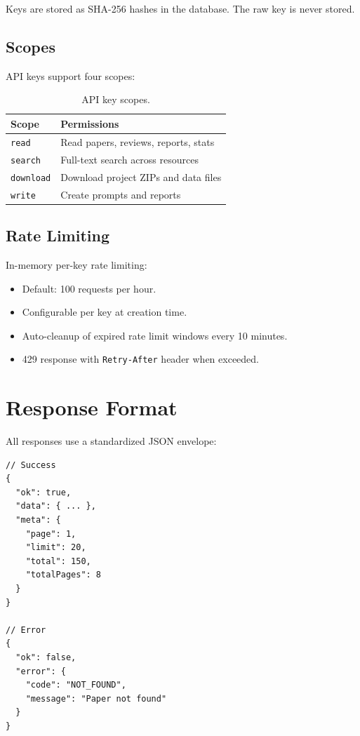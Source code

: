 Keys are stored as SHA-256 hashes in the database.
The raw key is never stored.

\subsection{Scopes}

API keys support four scopes:

\begin{table}[H]
\centering
\caption{API key scopes.}
\label{tab:api-scopes}
\begin{tabular}{ll}
\toprule
\textbf{Scope} & \textbf{Permissions} \\
\midrule
\texttt{read} & Read papers, reviews, reports, stats \\
\texttt{search} & Full-text search across resources \\
\texttt{download} & Download project ZIPs and data files \\
\texttt{write} & Create prompts and reports \\
\bottomrule
\end{tabular}
\end{table}

\subsection{Rate Limiting}

In-memory per-key rate limiting:
\begin{itemize}
  \item Default: 100 requests per hour.
  \item Configurable per key at creation time.
  \item Auto-cleanup of expired rate limit windows every 10 minutes.
  \item 429 response with \texttt{Retry-After} header when exceeded.
\end{itemize}

\section{Response Format}
\label{sec:api:format}

All responses use a standardized JSON envelope:

\begin{lstlisting}[style=typescript, caption=API response envelope.]
// Success
{
  "ok": true,
  "data": { ... },
  "meta": {
    "page": 1,
    "limit": 20,
    "total": 150,
    "totalPages": 8
  }
}

// Error
{
  "ok": false,
  "error": {
    "code": "NOT_FOUND",
    "message": "Paper not found"
  }
}
\end{lstlisting}

